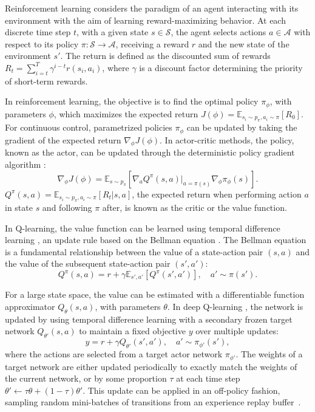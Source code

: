 \documentclass{article}
\newcommand{\y}{\gamma}
\newcommand{\E}{\mathbb{E}}
\newcommand{\lb}{\left [}
\newcommand{\rb}{\right ]}
\begin{document}
Reinforcement learning considers the paradigm of an agent interacting with its environment with the aim of learning reward-maximizing behavior. At each discrete time step $t$, with a given state $s \in \mathcal{S}$, the agent selects actions $a \in \mathcal{A}$ with respect to its policy $\pi: \mathcal{S} \rightarrow \mathcal{A}$, receiving a reward $r$ and the new state of the environment $s'$. The return is defined as the discounted sum of rewards $R_t = \sum_{i=t}^{T} \y^{i-t} r(s_i, a_i)$, where $\y$ is a discount factor determining the priority of short-term rewards. 

In reinforcement learning, the objective is to find the optimal policy $\pi_\phi$, with parameters $\phi$, which maximizes the expected return $J(\phi) = \E_{s_i \sim p_\pi, a_i \sim \pi} \lb R_0 \rb$. For continuous control, parametrized policies $\pi_\phi$ can be updated by taking the gradient of the expected return $\nabla_{\phi} J(\phi)$. In actor-critic methods, the policy, known as the actor, can be updated through the deterministic policy gradient algorithm \cite{DPG}:
\begin{equation}
\nabla_{\phi} J(\phi) = \E_{s \sim p_\pi} \lb \nabla_a Q^\pi(s,a)|_{a=\pi(s)} \nabla_{\phi} \pi_\phi(s) \rb. 
\end{equation}
$Q^\pi(s,a) = \E_{s_i \sim p_\pi, a_i \sim \pi} \lb R_t | s, a \rb$, the expected return when performing action $a$ in state $s$ and following $\pi$ after, is known as the critic or the value function. 

In Q-learning, the value function can be learned using temporal difference learning \cite{sutton1988tdlearning,watkins1989qlearning}, an update rule based on the Bellman equation \cite{bellman}. The Bellman equation is a fundamental relationship between the value of a state-action pair $(s,a)$ and the value of the subsequent state-action pair $(s',a')$:
\begin{equation}
Q^\pi(s, a) = r + \y \E_{s', a'} \lb Q^\pi(s', a') \rb, \quad a' \sim \pi(s').
\end{equation}

For a large state space, the value can be estimated with a differentiable function approximator $Q_\theta(s, a)$, with parameters $\theta$. In deep Q-learning \cite{DQN}, the network is updated by using temporal difference learning with a secondary frozen target network $Q_{\theta'}(s,a)$ to maintain a fixed objective $y$ over multiple updates:
\begin{equation}
y = r + \y Q_{\theta'}(s',a'), \quad a' \sim \pi_{\phi'}(s'),
\end{equation}
where the actions are selected from a target actor network $\pi_{\phi'}$. The weights of a target network are either updated periodically to exactly match the weights of the current network, or by some proportion $\tau$ at each time step $\theta' \leftarrow \tau \theta + (1 - \tau) \theta'$. This update can be applied in an off-policy fashion, sampling random mini-batches of transitions from an experience replay buffer~\cite{expreplay1992}.
\end{document}
